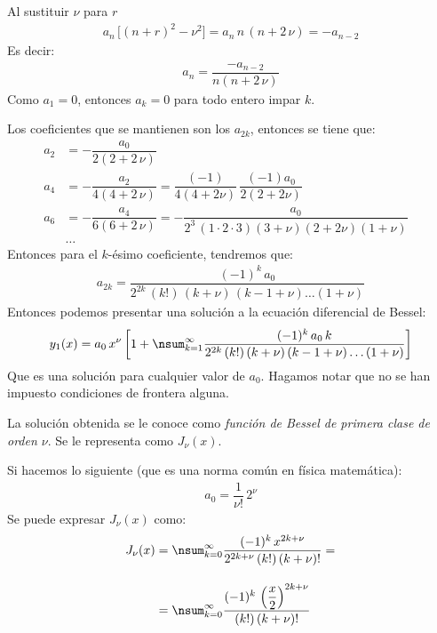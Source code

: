 Al sustituir $\nu$ para $r$
\begin{align*}
a_{n} \, \big[ (n + r)^{2} - \nu^{2} \big] = a_{n} \, n \, (n + 2 \, \nu) = - a_{n-2}
\end{align*}
Es decir:
\begin{align*}
a_{n} = \dfrac{- a_{n-2}}{n (n + 2 \, \nu)}
\end{align*}
Como $a_{1} = 0$, entonces $a_{k} = 0$ para todo entero impar $k$.
\par
Los coeficientes que se mantienen son los $a_{2 k}$, entonces se tiene que:
\begin{align*}
a_{2} &= - \dfrac{a_{0}}{2 (2 + 2 \, \nu)} \\[0.5em]
a_{4} &= - \dfrac{a_{2}}{4 (4 + 2 \, \nu)} = \dfrac{(-1)}{4 (4 + 2 \nu)} \, \dfrac{(-1)a_{0}}{2 (2 + 2 \nu)} \\[0.5em]
a_{6} &= - \dfrac{a_{4}}{6 (6 + 2 \, \nu)} = - \dfrac{a_{0}}{2^{3} \, (1 \cdot 2 \cdot 3) (3 + \nu)(2 + 2 \nu)(1 + \nu)}\\
&\ldots&
\end{align*}
Entonces para el $k$-ésimo coeficiente, tendremos que:
\begin{align*}
a_{2k} = \dfrac{(-1)^{k} \, a_{0}}{2^{2 k} \, (k!) \, (k + \nu) \, (k - 1 + \nu) \ldots (1 + \nu)}
\end{align*}
Entonces podemos presentar una solución a la ecuación diferencial de Bessel:
\begin{align*}
y_{1}(x) = a_{0} \, x^{\nu} \left[ 1 + \nsum_{k=1}^{\infty} \dfrac{(-1)^{k} \, a_{0} \, k}{2^{2 k} \, (k!) \, (k + \nu) \, (k -1 + \nu)\ldots (1 + \nu)} \right]
\end{align*}
Que es una solución para cualquier valor de $a_{0}$. Hagamos notar que no se han impuesto condiciones de frontera alguna.
\par
La solución obtenida se le conoce como \emph{función de Bessel de primera clase de orden $\nu$}. Se le representa como $J_{\nu} (x)$.
\par
Si hacemos lo siguiente (que es una norma común en física matemática):
\begin{align*}
a_{0} = \dfrac{1}{\nu!} \, 2^{\nu}
\end{align*}
Se puede expresar $J_{\nu}(x)$ como:
\begin{align*}
J_{\nu}(x) &= \nsum_{k=0}^{\infty} \dfrac{(-1)^{k} \, x^{2k+\nu}}{2^{2k+\nu} \, (k!) \, (k + \nu)!} = \\[1em]
&= \nsum_{k=0}^{\infty} \dfrac{(-1)^{k} \, \left( \dfrac{x}{2}\right)^{2k+\nu}}{(k!) \, (k + \nu)!}
\end{align*}

